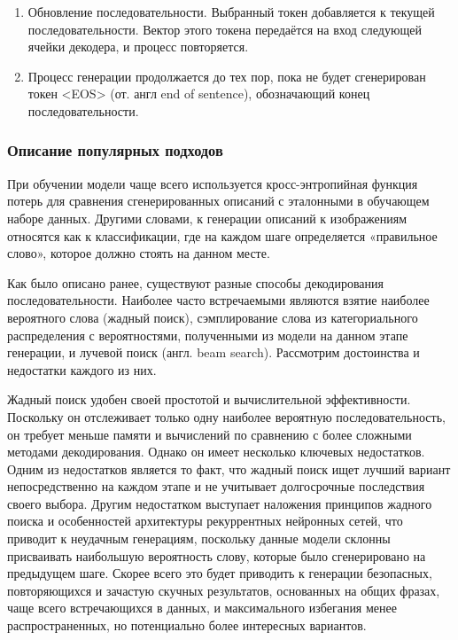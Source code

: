 \documentclass[a4paper,12pt]{extarticle}
\begin{document}
\begin{enumerate}[label=\arabic*.]
\begin{itemize}
	\end{itemize}
	\item Обновление последовательности. Выбранный токен добавляется к текущей последовательности. Вектор этого токена передаётся на вход следующей ячейки декодера, и процесс повторяется.
	\item Процесс генерации продолжается до тех пор, пока не будет сгенерирован токен <EOS> (от. англ end of sentence), обозначающий конец последовательности.
\end{enumerate}

\subsubsection{Описание популярных подходов}

При обучении модели чаще всего используется кросс-энтропийная функция потерь для
сравнения сгенерированных описаний с эталонными в обучающем наборе данных. Другими словами, к генерации описаний к изображениям относятся как к классификации, где на каждом шаге определяется «правильное слово», которое должно стоять на данном месте.

Как было описано ранее, существуют разные способы декодирования последовательности. Наиболее часто встречаемыми являются взятие наиболее вероятного слова (жадный поиск), сэмплирование слова из категориального распределения с вероятностями, полученными из модели на данном этапе генерации, и лучевой поиск (англ. beam search). Рассмотрим достоинства и недостатки каждого из них.

Жадный поиск удобен своей простотой и вычислительной эффективности. Поскольку он отслеживает только одну наиболее вероятную последовательность, он требует меньше памяти и вычислений по сравнению с более сложными методами декодирования. Однако он имеет несколько ключевых недостатков. Одним из недостатков является то факт, что жадный поиск ищет лучший вариант непосредственно на каждом этапе и не учитывает долгосрочные последствия своего выбора. Другим недостатком выступает наложения принципов жадного поиска и особенностей архитектуры рекуррентных нейронных сетей, что приводит к неудачным генерациям, поскольку данные модели склонны присваивать наибольшую вероятность слову, которые было сгенерировано на предыдущем шаге. Скорее всего это будет приводить к генерации безопасных, повторяющихся и зачастую скучных результатов, основанных на общих фразах, чаще всего встречающихся в данных, и максимального избегания менее распространенных, но потенциально более интересных вариантов.
\end{document}
